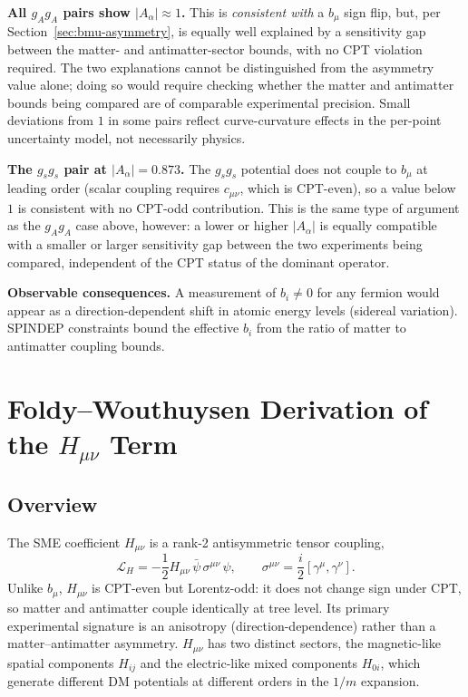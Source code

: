 \documentclass[main]{subfiles}
\begin{document}
\textbf{All $g_Ag_A$ pairs show $|A_\alpha|\approx1$.} This is
\emph{consistent with} a $b_\mu$ sign flip, but, per
Section~\ref{sec:bmu-asymmetry}, is equally well explained by a
sensitivity gap between the matter- and antimatter-sector bounds, with no
CPT violation required. The two explanations cannot be distinguished from
the asymmetry value alone; doing so would require checking whether the
matter and antimatter bounds being compared are of comparable experimental
precision. Small deviations from $1$ in some pairs reflect curve-curvature
effects in the per-point uncertainty model, not necessarily physics.

\textbf{The $g_sg_s$ pair at $|A_\alpha|=0.873$.} The $g_sg_s$ potential does
not couple to $b_\mu$ at leading order (scalar coupling requires $c_{\mu\nu}$,
which is CPT-even), so a value below $1$ is consistent with no CPT-odd
contribution. This is the same type of argument as the $g_Ag_A$ case above,
however: a lower or higher $|A_\alpha|$ is equally compatible with a smaller
or larger sensitivity gap between the two experiments being compared,
independent of the CPT status of the dominant operator.

\textbf{Observable consequences.} A measurement of $b_i\neq0$ for any
fermion would appear as a direction-dependent shift in atomic energy levels
(sidereal variation). SPINDEP constraints bound the effective $b_i$ from the
ratio of matter to antimatter coupling bounds.

\section{Foldy--Wouthuysen Derivation of the \texorpdfstring{$H_{\mu\nu}$}{H\_mu\_nu} Term}
\label{sec:Hmunu}

\subsection{Overview}

The SME coefficient $H_{\mu\nu}$ is a rank-2 antisymmetric tensor coupling,
\begin{equation}
  \mathcal L_H = -\frac12 H_{\mu\nu}\,\bar\psi\,\sigma^{\mu\nu}\,\psi,
  \qquad \sigma^{\mu\nu}=\frac{i}{2}[\gamma^\mu,\gamma^\nu].
\end{equation}
Unlike $b_\mu$, $H_{\mu\nu}$ is CPT-even but Lorentz-odd: it does not change
sign under CPT, so matter and antimatter couple identically at tree level.
Its primary experimental signature is an anisotropy (direction-dependence)
rather than a matter--antimatter asymmetry. $H_{\mu\nu}$ has two distinct
sectors, the magnetic-like spatial components $H_{ij}$ and the
electric-like mixed components $H_{0i}$, which generate different DM
potentials at different orders in the $1/m$ expansion.
\end{document}

